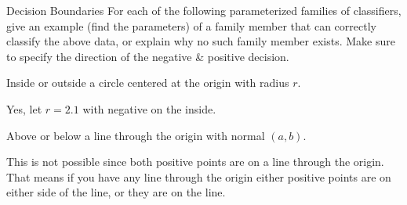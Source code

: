 \documentclass[12pt, letterpaper]{article}
\begin{document}
\begin{problem}{Decision Boundaries}
    For each of the following parameterized families of classifiers, give an example (find the parameters) of a
    family member that can correctly classify the above data, or explain why no such family member exists.
    Make sure to specify the direction of the negative \& positive decision.
\end{problem}
\begin{subproblem}{}
    Inside or outside a circle centered at the origin with radius $r$.
\end{subproblem}
\begin{solution}
    Yes, let $r=2.1$ with negative on the inside.\\
\end{solution}
\begin{subproblem}{}
    Above or below a line through the origin with normal $(a, b)$.
\end{subproblem}
\begin{solution}
    This is not possible since both positive points are on a line through the origin.
    That means if you have any line through the origin either positive points are on either 
    side of the line, or they are on the line.
\end{solution}
\end{document}

